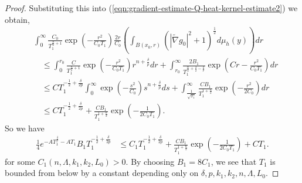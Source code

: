 \documentclass[12pt]{amsart}
\newcommand{\hdel}{\tilde{\nabla}}
\theoremstyle{remark}
\numberwithin{equation}{section}
\begin{document}
\begin{proof}
    
    Substituting this into (\ref{eqn:gradient-estimate-Q-heat-kernel-estimate2}) we obtain,
    \begin{align*}
        &\int_0^{\infty} \frac{C_0}{T_1^{\frac{n}{2}+1}}\exp\left(-\frac{r^2}{C_0 T_1}\right)\frac{2r}{C_0}\left(\int_{B(x_0, r)}\left(|\hdel g_0|^2 + 1\right)^{\frac{1}{2}}d\mu_h(y)\right)dr \nonumber \\
        &\quad \leq \int_0^{r_0} \frac{C}{T_1^{\frac{n}{2}+1}}\exp\left(-\frac{r^2}{C_0 T_1}\right)r^{n+\frac{\delta}{p}}dr + \int_{r_0}^{\infty} \frac{2B_1}{T_1^{\frac{n}{2}+\frac32-\frac{\delta}{p}}}\exp\left(Cr-\frac{r^2}{C_0 T_1}\right)  dr \nonumber \\
        &\quad \leq CT_1^{-\frac{1}{2}+\frac{\delta}{2p}}\int_0^\infty\exp\left(-\frac{s^2}{C_0}\right)s^{n+\frac{\delta}{p}}ds + \int_{\frac{1}{\sqrt{T_1}}}^\infty \frac{CB_1}{T_1^{1+\frac{n}{2}}}\exp\left(-\frac{r^2}{2C_0} \right) dr\\
        &\quad\leq CT_1^{-\frac{1}{2}+\frac{\delta}{2p}} +  \frac{CB_1}{T_1^{1+\frac{n}{2}}}\exp\left(-\frac{1}{2C_0T_1} \right).
    \end{align*}
  So we have
    \begin{align}\label{eqn:gradient-estimate-Q-heat-kernel-estimate4}
        \frac14 e^{-AT_1^{\frac{\delta}{p}}-AT_1}B_1T_1^{-\frac{1}{2}+\frac{\delta}{2p}} &\leq C_1 T_1^{-\frac{1}{2}+\frac{\delta}{2p}} +  \frac{CB_1}{T_1^{1+\frac{n}{2}}}\exp\left(-\frac{1}{2C_0T_1} \right)+ C T_1.
    \end{align}
    for some $C_1(n,\Lambda,k_1,k_2,L_0)>0$.
 By choosing $B_1=8C_1$, we see that $T_1$ is bounded from below by a constant depending only on $\delta,p,k_1,k_2,n,\Lambda,L_0$.
\end{proof}
\end{document}
